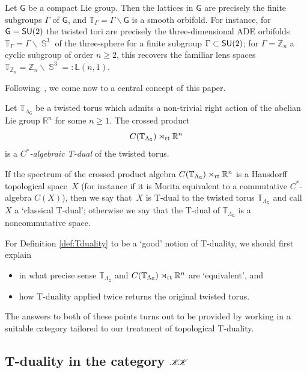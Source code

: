 \documentclass[10pt,a4paper]{amsart}
\numberwithin{equation}{section}
\DeclareMathOperator{\Sphere}{\mathbb{S}}
\newcommand{\CCK}{\mathscr{K}}
\newcommand{\sfG}{\mathsf{G}}
\newcommand{\SU}{{\sf SU}}
\newcommand{\rt}{{\rm rt}}
\newcommand{\zed}{{\mathbb Z}} %
\newcommand{\real}{{\mathbb R}} %
\newcommand{\torus}{{\mathbb T}} %
\begin{document}
\begin{Example}[orbifolds]
Let $\sfG$ be a compact Lie group. Then the lattices in $\sfG$ are
precisely the finite subgroups $\Gamma$ of $\sfG$, and
$\torus_\Gamma=\Gamma\backslash\sfG$ is a smooth orbifold. For instance,
for $\sfG=\SU(2)$ the twisted tori are precisely the three-dimensional
ADE orbifolds $\torus_\Gamma=\Gamma\backslash\Sphere^3$
of the three-sphere for a finite subgroup $\Gamma\subset\SU(2)$;
for $\Gamma=\zed_n$ a cyclic subgroup of order $n\geq2$, this recovers
the familiar lens spaces $\torus_{\zed_n}=\zed_n\backslash\Sphere^3=:\mathbb{L}(n,1)$.
\end{Example}

Following~\cite{Mathai2004}, we come now to a central concept of this paper.

\begin{Definition}\label{def:Tduality}
Let $\torus_{\Lambda_\sfG}$ be a twisted torus which admits a
non-trivial right action
of the abelian Lie group $\real^n$ for some $n\geq1$. The crossed product
\[
C(\torus_{\Lambda_\sfG})\rtimes_\rt \real^n
\]
is a \emph{$C^*$-algebraic T-dual} of the twisted torus.
\end{Definition}
If the spectrum of the crossed product algebra $
C(\torus_{\Lambda_\sfG})\rtimes_\rt \real^n
$ is a Hausdorff topological space~$X$ (for instance
if it is Morita
equivalent to a commutative $C^*$-algebra $C(X)$), then we say that~$X$ is T-dual to the
twisted torus $\torus_{\Lambda_\sfG}$ and call $X$ a `classical T-dual'; otherwise we say that the T-dual of
$\torus_{\Lambda_\sfG}$ is a noncommutative space.

For Definition \ref{def:Tduality} to be a `good' notion of T-duality, we should first explain
\begin{itemize}\itemsep=0pt
\item[(a)] in
what precise sense $\torus_{\Lambda_\sfG}$ and
$C(\torus_{\Lambda_\sfG})\rtimes_\rt\real^n$ are `equivalent', and
\item[(b)] how
T-duality applied twice returns the original twisted torus.
\end{itemize}
The answers to both of these points turns out to be provided by
working in a suitable category tailored to our treatment of
topological T-duality.

\subsection[T-duality in the category $\CCK\hspace{-1mm}\CCK$]{T-duality in the category $\CCK\hspace{-1mm}\CCK$}
\label{sec:TdualityKK}
\end{document}
